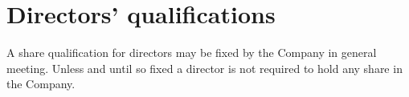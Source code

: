\section{Directors' qualifications}

A share qualification for directors may be fixed by the Company in general meeting. Unless and until so fixed a director is not required to hold any share in the Company. 